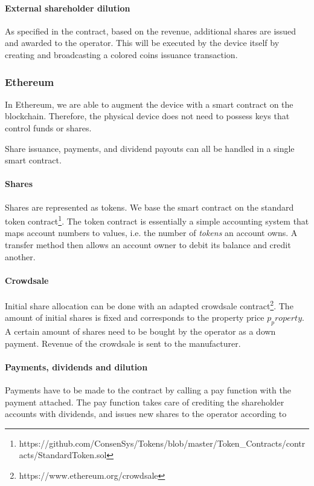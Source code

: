\paragraph{External shareholder dilution}
As specified in the contract, based on the revenue, additional shares are issued and awarded to the operator. This will be executed by the device itself by creating and broadcasting a colored coins issuance transaction.

\subsubsection{Ethereum}

In Ethereum, we are able to augment the device with a smart contract on the blockchain. Therefore, the physical device does not need to possess keys that control funds or shares. 

Share issuance, payments, and dividend payouts can all be handled in a single smart contract.

\paragraph{Shares}

Shares are represented as tokens. We base the smart contract on the standard token contract\footnote{https://github.com/ConsenSys/Tokens/blob/master/Token\_Contracts/contracts/StandardToken.sol}. The token contract is essentially a simple accounting system that maps account numbers to values, i.e. the number of \emph{tokens} an account owns. A transfer method then allows an account owner to debit its balance and credit another.

\paragraph{Crowdsale}

Initial share allocation can be done with an adapted crowdsale contract\footnote{https://www.ethereum.org/crowdsale}. The amount of initial shares is fixed and corresponds to the property price $p_property$. A certain amount of shares need to be bought by the operator as a down payment. Revenue of the crowdsale is sent to the manufacturer. 

\paragraph{Payments, dividends and dilution}

Payments have to be made to the contract by calling a pay function with the payment attached. The pay function takes care of crediting the shareholder accounts with dividends, and issues new shares to the operator according to

